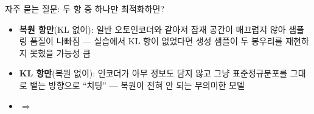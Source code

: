 \begin{frame}{자주 묻는 질문: 두 항 중 하나만 최적화하면?}
  \begin{itemize}
    \item \textbf{복원 항만}(KL 없이): 일반 오토인코더와 같아져
      잠재 공간이 매끄럽지 않아 샘플링 품질이 나빠짐 — 실습에서
      KL 항이 없었다면 생성 샘플이 두 봉우리를 재현하지 못했을
      가능성 큼
    \item \textbf{KL 항만}(복원 없이): 인코더가 아무 정보도 담지 않고
      그냥 표준정규분포를 그대로 뱉는 방향으로 ``치팅'' — 복원이
      전혀 안 되는 무의미한 모델
    \item $\Rightarrow$ 
  \end{itemize}
\end{frame}
